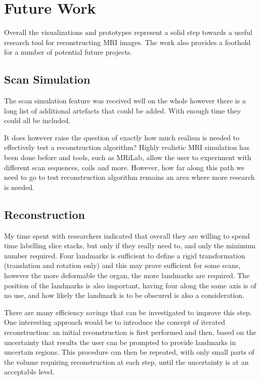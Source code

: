\chapter{Future Work}
Overall the visualizations and prototypes represent a solid step towards a useful research tool for reconstructing MRI images. The work also provides a foothold for a number of potential future projects.

\section{Scan Simulation}
The scan simulation feature was received well on the whole however there is a long list of additional artefacts that could be added. With enough time they could all be included.

It does however raise the question of exactly how much realism is needed to effectively test a reconstruction algorithm? Highly realistic MRI simulation has been done before and tools, such as MRiLab\cite{mrilab}, allow the user to experiment with different scan sequences, coils and more. However, how far along this path we need to go to test reconstruction algorithm remains an area where more research is needed.

\section{Reconstruction}
My time spent with researchers indicated that overall they are willing to spend time labelling slice stacks, but only if they really need to, and only the minimum number required. Four landmarks is sufficient to define a rigid transformation (translation and rotation only) and this may prove sufficient for some scans, however the more deformable the organ, the more landmarks are required. The position of the landmarks is also important, having four  along the same axis is of no use, and how likely the landmark is to be obscured is also a consideration.

There are many efficiency savings that can be investigated to improve this step. One interesting approach would be to introduce the concept of iterated reconstruction: an initial reconstruction is first performed and then, based on the uncertainty that results the user can be prompted to provide landmarks in uncertain regions. This procedure can then be repeated, with only small parts of the volume requiring reconstruction at each step, until the uncertainty is at an acceptable level.


